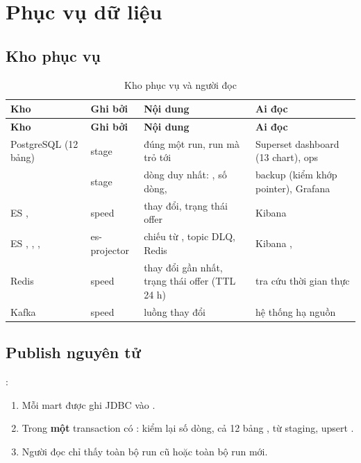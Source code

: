 \chapter{Phục vụ dữ liệu}\label{chap:serving}

\section{Kho phục vụ}
\begin{xltabular}{\linewidth}{@{}L{48mm}L{24mm}Y L{34mm}@{}}
  \caption{Kho phục vụ và người đọc}\label{tab:serving}\\
  \toprule
  \textbf{Kho} & \textbf{Ghi bởi} & \textbf{Nội dung} & \textbf{Ai đọc} \\
  \midrule
  \endfirsthead
  \toprule \textbf{Kho} & \textbf{Ghi bởi} & \textbf{Nội dung} & \textbf{Ai đọc} \\ \midrule
  \endhead
  PostgreSQL  (12 bảng) & stage  & đúng một run, run mà  trỏ tới & Superset dashboard  (13 chart), ops \\
   & stage  & dòng duy nhất: , số dòng,  & backup (kiểm khớp pointer), Grafana \\
  ES ,  & speed & thay đổi, trạng thái offer & Kibana  \\
  ES , , ,  & es-projector & chiếu từ , topic DLQ, Redis & Kibana ,  \\
  Redis  & speed & thay đổi gần nhất, trạng thái offer (TTL 24 h) & tra cứu thời gian thực \\
  Kafka  & speed & luồng thay đổi & hệ thống hạ nguồn \\
  \bottomrule
\end{xltabular}

\section{Publish nguyên tử}
:
\begin{enumerate}
  \item Mỗi mart được ghi JDBC vào .
  \item Trong \textbf{một} transaction có : kiểm lại số dòng,  cả 12 bảng ,
         từ staging, upsert .
  \item Người đọc chỉ thấy toàn bộ run cũ hoặc toàn bộ run mới.
\end{enumerate}


